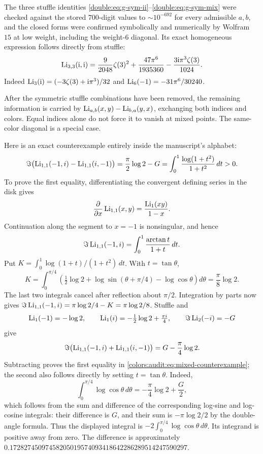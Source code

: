 \begin{remark}
The three stuffle identities \eqref{double:eq:g-sym-ii}--\eqref{double:eq:g-sym-mix} were checked against the stored
$700$-digit values to ${\sim}10^{-692}$ for every admissible $a,b$, and the closed forms were
confirmed symbolically and numerically by Wolfram~$15$ at low weight, including the weight-$6$
diagonal. Its exact homogeneous expression follows directly from stuffle:
\[
 \operatorname{Li}_{3,3}(\mathrm{i},\mathrm{i})=\frac9{2048}\zeta(3)^2+\frac{47\pi^6}{1935360}
 -\frac{3\mathrm{i}\pi^3\zeta(3)}{1024}.
\]
Indeed $\operatorname{Li}_3(\mathrm{i})=(-3\zeta(3)+\mathrm{i}\pi^3)/32$ and
$\operatorname{Li}_6(-1)=-31\pi^6/30240$.
\end{remark}

After the symmetric stuffle combinations have been removed, the remaining
information is carried by $\operatorname{Li}_{a,b}(x,y)-\operatorname{Li}_{b,a}(y,x)$, exchanging both
indices and colors. Equal indices alone do not force it to vanish at mixed
points. The same-color diagonal is a special case.

Here is an exact counterexample entirely inside the manuscript's
alphabet:
\begin{equation}\label{colors:audit:eq:mixed-counterexample}
 \Im\bigl(\operatorname{Li}_{1,1}(-1,i)-\operatorname{Li}_{1,1}(i,-1)\bigr)
 =\frac\pi2\log2-G
 =\int_0^1\frac{\log(1+t^2)}{1+t^2}\,dt>0.
\end{equation}
To prove the first equality, differentiating the convergent defining
series in the disk gives
\[
 \frac{\partial}{\partial x}\operatorname{Li}_{1,1}(x,y)
   =\frac{\operatorname{Li}_1(xy)}{1-x}.
\]
Continuation along the segment to $x=-1$ is nonsingular, and hence
\[
 \Im\operatorname{Li}_{1,1}(-1,i)=\int_0^1\frac{\arctan t}{1+t}\,dt.
\]
Put $K=\int_0^1\log(1+t)/(1+t^2)\,dt$. With $t=\tan\theta$,
\[
 K=\int_0^{\pi/4}\left(
   \tfrac12\log2+\log\sin(\theta+\pi/4)-\log\cos\theta
   \right)d\theta=\frac\pi8\log2.
\]
The last two integrals cancel after reflection about $\pi/2$.
Integration by parts now gives
$\Im\operatorname{Li}_{1,1}(-1,i)=\pi\log2/4-K=\pi\log2/8$.
Stuffle and
\[
 \operatorname{Li}_1(-1)=-\log2,\qquad
 \operatorname{Li}_1(i)=-\tfrac12\log2+\tfrac{\pi i}{4},\qquad
 \Im\operatorname{Li}_2(-i)=-G
\]
give
\[
 \Im\bigl(\operatorname{Li}_{1,1}(-1,i)+\operatorname{Li}_{1,1}(i,-1)\bigr)
   =G-\frac\pi4\log2.
\]
Subtracting proves the first equality in
\eqref{colors:audit:eq:mixed-counterexample}; the second also follows directly by setting $t=\tan\theta$. Indeed,
\[
 \int_0^{\pi/4}\log\cos\theta\,d\theta
 =-\frac\pi4\log2+\frac G2,
\]
which follows from the sum and difference of the corresponding
log-sine and log-cosine integrals: their difference is $G$, and their
sum is $-\pi\log2/2$ by the double-angle formula. Thus the displayed
integral is $-2\int_0^{\pi/4}\log\cos\theta\,d\theta$.
Its integrand is positive away from zero. The difference is approximately
$0.17282745097458205019574093418642286289514247590297$.


